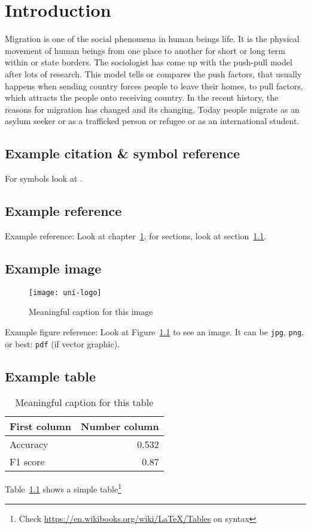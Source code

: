 \chapter{Introduction}\label{chap:introduction}
Migration is one of the social phenomena in human beings life. It is the physical movement of human beings from one place to another for short or long term within or state borders. The sociologist has come up with the push-pull model after lots of research. This model tells or compares the push factors, that usually happens when sending country forces people to leave their homes, to pull factors, which attracts the people onto receiving country. In the recent history, the reasons for migration has changed and its changing. Today people migrate as an asylum seeker or as a trafficked person or refugee or as an international student.

\section{Example citation \& symbol reference}\label{sec:citation}
For symbols look at \cite{latex_symbols_2017}.


\section{Example reference}
Example reference: Look at chapter~\ref{chap:introduction}, for sections, look at section~\ref{sec:citation}.

\section{Example image}

\begin{figure}
	\centering
	\texttt{[image: uni-logo]}
	\caption{Meaningful caption for this image}
	\label{fig:uniLogo}
\end{figure}

Example figure reference: Look at Figure~\ref{fig:uniLogo} to see an image. It can be \texttt{jpg}, \texttt{png}, or best: \texttt{pdf} (if vector graphic).

\section{Example table}

\begin{table}
	\centering
	\begin{tabular}{lr}
		First column & Number column \\
		\hline
		Accuracy & 0.532 \\
		F1 score & 0.87
	\end{tabular}
	\caption{Meaningful caption for this table}
	\label{tab:result}
\end{table}





Table~\ref{tab:result} shows a simple table\footnote{Check \url{https://en.wikibooks.org/wiki/LaTeX/Tables} on syntax}